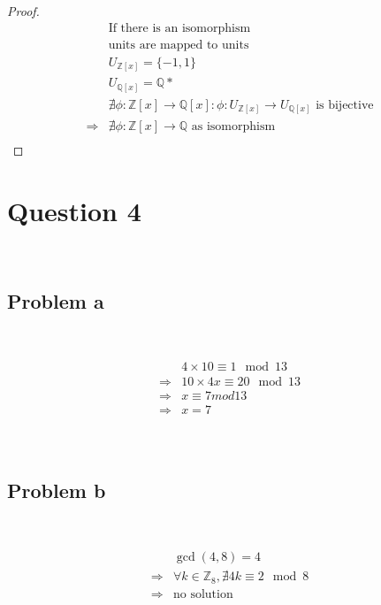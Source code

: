 \documentclass{article}
\begin{document}
\begin{proof}
    \begin{align*}
        &\text{If there is an isomorphism}\\
        &\text{units are mapped to units}\\
        &U_{\mathbb{Z} [x]}=\{-1,1\}\\
        &U_{\mathbb{Q} [x]}=\mathbb{Q} *\\
        &\nexists \phi:\mathbb{Z} [x]\rightarrow\mathbb{Q} [x]:\phi:U_{\mathbb{Z} [x]}\rightarrow U_{\mathbb{Q} [x]}\text{ is bijective}\\
        \Rightarrow&\nexists\phi:\mathbb{Z} [x]\rightarrow\mathbb{Q}\text{ as isomorphism}\\
    \end{align*}
\end{proof}

\newpage

\section*{Question 4}

~

\subsection*{Problem a}

~

\begin{align*}
    &4\times 10\equiv 1\mod 13\\
    \Rightarrow&10\times 4x\equiv 20\mod13\\
    \Rightarrow&x\equiv 7mod 13\\
    \Rightarrow& x=7\\
\end{align*}

~

\subsection*{Problem b}

~

\begin{align*}
    &\gcd(4,8)=4\\
    \Rightarrow&\forall k\in \mathbb{Z} _8,\nexists 4k \equiv 2\mod 8\\
    \Rightarrow&\text{no solution}\\
\end{align*}
\end{document}
